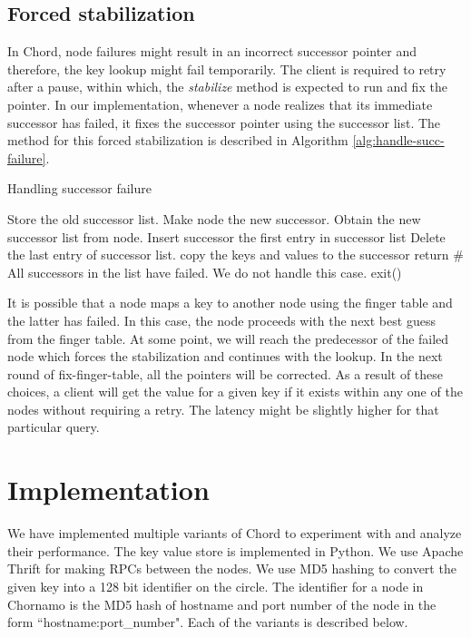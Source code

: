 \documentclass{sig-alternate-10pt}
\begin{document}
\subsection{Forced stabilization}
In Chord, node failures might result in an incorrect successor pointer and therefore, the key lookup might fail temporarily. The client is required to retry after a pause, within which, the \textit{stabilize} method is expected to run and fix the pointer. In our implementation, whenever a node realizes that its immediate successor has failed, it fixes the successor pointer using the successor list. The method for this forced stabilization is described in Algorithm \ref{alg:handle-succ-failure}.
\begin{algorithm}[t]
\caption{Handling successor failure} \label{alg:handle-succ-failure}
\begin{algorithmic}
            \State Store the old successor list.
            \State Make node the new successor.
            \State Obtain the new successor list from node.
            \State Insert successor the first entry in successor list
            \State Delete the last entry of successor list.
                \State copy the keys and values to the successor
            \EndFor
            \State return
        \EndIf
    \EndFor
    \# All successors in the list have failed. We do not handle this case.
    \State exit()
\end{algorithmic}
\end{algorithm}

It is possible that a node maps a key to another node using the finger table and the latter has failed. In this case, the node proceeds with the next best guess from the finger table. At some point, we will reach the predecessor of the failed node which forces the stabilization and continues with the lookup. In the next round of fix-finger-table, all the pointers will be corrected. As a result of these choices, a client will get the value for a given key if it exists within any one of the nodes without requiring a retry. The latency might be slightly higher for that particular query.

\section{Implementation}
We have implemented multiple variants of Chord to experiment with and analyze their performance. The key value store is implemented in Python. We use Apache Thrift \cite{thrift} for making RPCs between the nodes. We use MD5 hashing to convert the given key into a 128 bit identifier on the circle. The identifier for a node in Chornamo is the MD5 hash of hostname and port number of the node in the form ``hostname:port\_number".  Each of the variants is described below.
\end{document}
